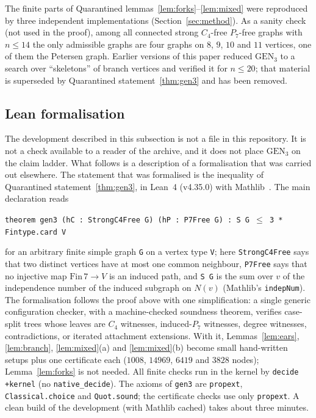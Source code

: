 \documentclass[11pt]{amsart}
\theoremstyle{definition}
\theoremstyle{remark}
\newcommand{\GEN}{\mathrm{GEN}}
\begin{document}
The finite parts of Quarantined lemmas~\ref{lem:forks}--\ref{lem:mixed} were reproduced by three independent implementations (Section~\ref{sec:method}). As a sanity check (not used in the proof), among all connected strong $C_4$-free $P_7$-free graphs with $n\le14$ the only admissible graphs are four graphs on $8$, $9$, $10$ and $11$ vertices, one of them the Petersen graph. Earlier versions of this paper reduced $\GEN_3$ to a search over ``skeletons'' of branch vertices and verified it for $n\le20$; that material is superseded by Quarantined statement~\ref{thm:gen3} and has been removed.

\subsection{Lean formalisation}\label{sec:lean}
The development described in this subsection is not a file in this repository. It is not a check available to a reader of the archive, and it does not place $\GEN_3$ on the claim ladder. What follows is a description of a formalisation that was carried out elsewhere. The statement that was formalised is the inequality of Quarantined statement~\ref{thm:gen3}, in Lean~4 (v4.35.0) with Mathlib~\cite{lean4,mathlib}. The main declaration reads
\begin{center}
\texttt{theorem gen3 (hC : StrongC4Free G) (hP : P7Free G) : S G \(\le\) 3 * Fintype.card V}
\end{center}
for an arbitrary finite simple graph \texttt{G} on a vertex type \texttt{V}; here \texttt{StrongC4Free} says that two distinct vertices have at most one common neighbour, \texttt{P7Free} says that no injective map $\mathrm{Fin}\,7\to V$ is an induced path, and \texttt{S G} is the sum over $v$ of the independence number of the induced subgraph on $N(v)$ (Mathlib's \texttt{indepNum}). The formalisation follows the proof above with one simplification: a single generic configuration checker, with a machine-checked soundness theorem, verifies case-split trees whose leaves are $C_4$ witnesses, induced-$P_7$ witnesses, degree witnesses, contradictions, or iterated attachment extensions. With it, Lemmas~\ref{lem:ears}, \ref{lem:branch}, \ref{lem:mixed}(a) and \ref{lem:mixed}(b) become small hand-written setups plus one certificate each ($1008$, $14969$, $6419$ and $3828$ nodes); Lemma~\ref{lem:forks} is not needed. All finite checks run in the kernel by \texttt{decide +kernel} (no \texttt{native\_decide}). The axioms of \texttt{gen3} are \texttt{propext}, \texttt{Classical.choice} and \texttt{Quot.sound}; the certificate checks use only \texttt{propext}. A clean build of the development (with Mathlib cached) takes about three minutes.
\end{document}
